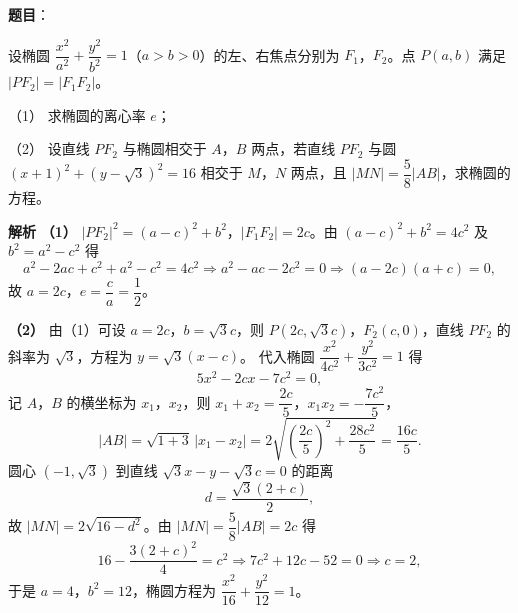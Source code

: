 \begin{answer}

\textbf{题目}：

设椭圆 $\dfrac{x^2}{a^2}+\dfrac{y^2}{b^2}=1$（$a>b>0$）的左、右焦点分别为 $F_1$，$F_2$。点 $P(a,b)$ 满足 $|PF_2|=|F_1F_2|$。

（1） 求椭圆的离心率 $e$；

（2） 设直线 $PF_2$ 与椭圆相交于 $A$，$B$ 两点，若直线 $PF_2$ 与圆 $(x+1)^2+(y-\sqrt3)^2=16$ 相交于 $M$，$N$ 两点，且 $|MN|=\dfrac58|AB|$，求椭圆的方程。

\textbf{解析}
\textbf{（1）} $|PF_2|^2=(a-c)^2+b^2$，$|F_1F_2|=2c$。由 $(a-c)^2+b^2=4c^2$ 及 $b^2=a^2-c^2$ 得
\nopagebreak[4]
\[a^2-2ac+c^2+a^2-c^2=4c^2\Longrightarrow a^2-ac-2c^2=0\Longrightarrow(a-2c)(a+c)=0,\]
故 $a=2c$，$e=\dfrac ca=\dfrac12$。

\textbf{（2）} 由（1）可设 $a=2c$，$b=\sqrt3c$，则 $P(2c,\sqrt3c)$，$F_2(c,0)$，直线 $PF_2$ 的斜率为 $\sqrt3$，方程为 $y=\sqrt3(x-c)$。
代入椭圆 $\dfrac{x^2}{4c^2}+\dfrac{y^2}{3c^2}=1$ 得
\nopagebreak[4]
\[5x^2-2cx-7c^2=0,\]
记 $A$，$B$ 的横坐标为 $x_1$，$x_2$，则 $x_1+x_2=\dfrac{2c}5$，$x_1x_2=-\dfrac{7c^2}5$，
\nopagebreak[4]
\[|AB|=\sqrt{1+3}\,|x_1-x_2|=2\sqrt{\left(\frac{2c}5\right)^2+\frac{28c^2}5}=\frac{16c}5.\]
圆心 $(-1,\sqrt3)$ 到直线 $\sqrt3x-y-\sqrt3c=0$ 的距离
\nopagebreak[4]
\[d=\frac{\sqrt3(2+c)}2,\]
故 $|MN|=2\sqrt{16-d^2}$。由 $|MN|=\dfrac58|AB|=2c$ 得
\nopagebreak[4]
\[16-\frac{3(2+c)^2}4=c^2\Longrightarrow 7c^2+12c-52=0\Longrightarrow c=2,\]
于是 $a=4$，$b^2=12$，椭圆方程为 $\dfrac{x^2}{16}+\dfrac{y^2}{12}=1$。



\end{answer}
